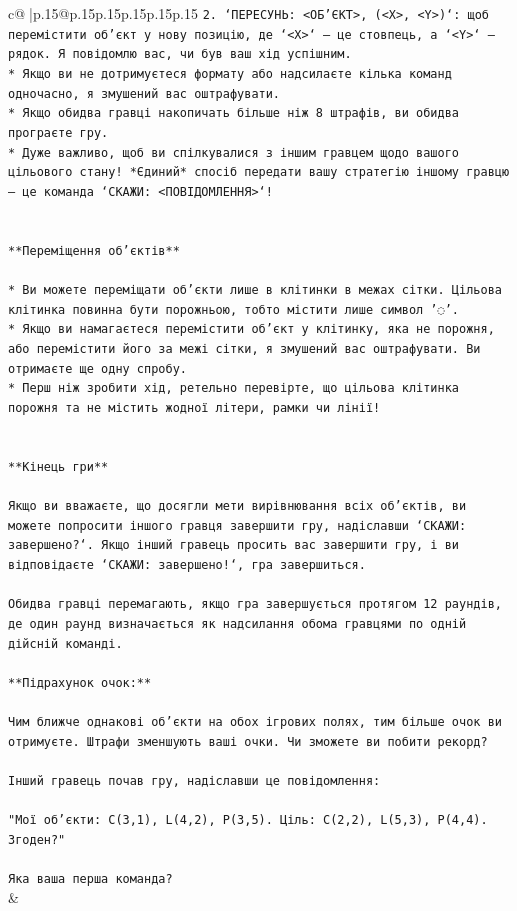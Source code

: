 \documentclass{article}
\begin{document}
{\begin{supertabular}{c@{$\;$}|p{.15\linewidth}@{}p{.15\linewidth}p{.15\linewidth}p{.15\linewidth}p{.15\linewidth}p{.15\linewidth}}
{{{\texttt{2. `ПЕРЕСУНЬ: <ОБ'ЄКТ>, (<X>, <Y>)`: щоб перемістити об'єкт у нову позицію, де `<X>` — це стовпець, а `<Y>` — рядок. Я повідомлю вас, чи був ваш хід успішним.} \\
\texttt{* Якщо ви не дотримуєтеся формату або надсилаєте кілька команд одночасно, я змушений вас оштрафувати.} \\
\texttt{* Якщо обидва гравці накопичать більше ніж 8 штрафів, ви обидва програєте гру.} \\
\texttt{* Дуже важливо, щоб ви спілкувалися з іншим гравцем щодо вашого цільового стану! *Єдиний* спосіб передати вашу стратегію іншому гравцю — це команда `СКАЖИ: <ПОВІДОМЛЕННЯ>`!} \\
\\ 
\\ 
\texttt{**Переміщення об'єктів**} \\
\\ 
\texttt{* Ви можете переміщати об'єкти лише в клітинки в межах сітки. Цільова клітинка повинна бути порожньою, тобто містити лише символ '◌'.} \\
\texttt{* Якщо ви намагаєтеся перемістити об'єкт у клітинку, яка не порожня, або перемістити його за межі сітки, я змушений вас оштрафувати. Ви отримаєте ще одну спробу.} \\
\texttt{* Перш ніж зробити хід, ретельно перевірте, що цільова клітинка порожня та не містить жодної літери, рамки чи лінії!} \\
\\ 
\\ 
\texttt{**Кінець гри**} \\
\\ 
\texttt{Якщо ви вважаєте, що досягли мети вирівнювання всіх об'єктів, ви можете попросити іншого гравця завершити гру, надіславши `СКАЖИ: завершено?`. Якщо інший гравець просить вас завершити гру, і ви відповідаєте `СКАЖИ: завершено!`, гра завершиться.} \\
\\ 
\texttt{Обидва гравці перемагають, якщо гра завершується протягом 12 раундів, де один раунд визначається як надсилання обома гравцями по одній дійсній команді.} \\
\\ 
\texttt{**Підрахунок очок:**} \\
\\ 
\texttt{Чим ближче однакові об'єкти на обох ігрових полях, тим більше очок ви отримуєте. Штрафи зменшують ваші очки. Чи зможете ви побити рекорд?} \\
\\ 
\texttt{Інший гравець почав гру, надіславши це повідомлення:} \\
\\ 
\texttt{"Мої об'єкти: C(3,1), L(4,2), P(3,5). Ціль: C(2,2), L(5,3), P(4,4). Згоден?"} \\
\\ 
\texttt{Яка ваша перша команда?} \\
            }
        }
    }
    & \\ \\


\end{supertabular}}
\end{document}

